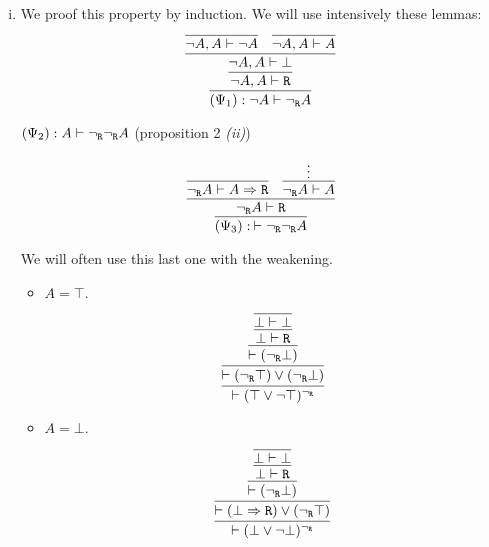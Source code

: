 \begin{enumerate}[(i)]
    \item We proof this property by induction.
    We will use intensively these lemmas:
    $$
    \infer{
        (\Psi_1) : \neg A \vdash \ngr A
    }{
        \infer{
            \neg A, A \vdash \R
        }{
            \infer{
                \neg A, A \vdash \bot
            }{
                \infer{
                    \neg A, A \vdash \neg A
                }{
                }&
                \infer{
                    \neg A, A \vdash A
                }{
                }
            }
        }
    }
    $$
    
    $(\Psi_2) : A \vdash {\neg_{\texttt{R}}} {\neg_{\texttt{R}}} A$ (proposition 2 \textit{(ii)})
    
    $$
    \infer{
        (\Psi_3) :\: \vdash \ngr \ngr A
    }{
        \infer{
             \ngr A \vdash \R
        }{
            \infer{
                 \ngr A \vdash A\Rightarrow \R
            }{
            }&
            \infer{
            \ngr A \vdash A
            }{
                \vdots
            }
        }
    }
    $$
    
    We will often use this last one with the weakening.
    
    \begin{itemize}
        \item $A = \top$.
            $$
            \infer{
                \vdash (\top \vee \neg \top)^\ngr
            }{
                \infer{
                    \vdash (\ngr \top) \vee (\ngr \bot)
                }{
                    \infer{
                        \vdash (\ngr \bot)
                    }{
                        \infer{
                            \bot \vdash \R
                        }{
                            \infer{
                                \bot \vdash \bot
                            }{
                            }
                        }
                    }
                }
            }
            $$
        \item $A = \bot$.
            $$
            \infer{
                \vdash (\bot \vee \neg \bot)^\ngr
            }{
                \infer{
                    \vdash (\bot \Rightarrow \R) \vee (\ngr \top)
                }{
                    \infer{
                        \vdash (\ngr \bot)
                    }{
                        \infer{
                            \bot \vdash \R
                        }{
                            \infer{\bot \vdash \bot}{}
                        }
                    }
                }
            }
            $$


\end{itemize}
\end{enumerate}
